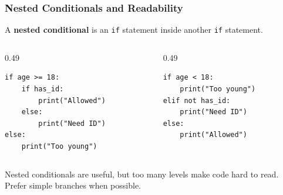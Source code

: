 \documentclass[aspectratio=169,10pt]{beamer}
\newcommand{\keyword}[1]{\textcolor{PrimaryBlue}{\textbf{#1}}}
\begin{document}
\begin{frame}[fragile]
\frametitle{Nested Conditionals and Readability}
A \keyword{nested conditional} is an \texttt{if} statement inside another \texttt{if} statement.

\begin{columns}[T,totalwidth=\textwidth]
\begin{column}{0.49\textwidth}
\begin{tcolorbox}[lecturebox,title=Nested version]
\begin{lstlisting}[style=pycodesmall]
if age >= 18:
    if has_id:
        print("Allowed")
    else:
        print("Need ID")
else:
    print("Too young")
\end{lstlisting}
\end{tcolorbox}
\end{column}
\begin{column}{0.49\textwidth}
\begin{tcolorbox}[lecturebox,title=Flatter version]
\begin{lstlisting}[style=pycodesmall]
if age < 18:
    print("Too young")
elif not has_id:
    print("Need ID")
else:
    print("Allowed")
\end{lstlisting}
\end{tcolorbox}
\end{column}
\end{columns}

\begin{tcolorbox}[lecturebox,title=Beginner guideline]
Nested conditionals are useful, but too many levels make code hard to read. Prefer simple branches when possible.
\end{tcolorbox}
\end{frame}
\end{document}
